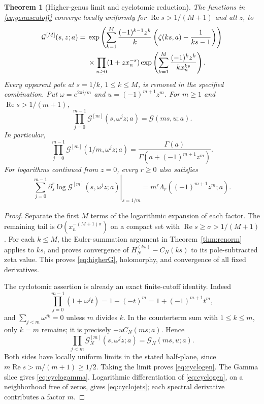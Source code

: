 \documentclass[11pt]{article}
\numberwithin{equation}{section}
\newtheorem{theorem}{Theorem}[section]
\theoremstyle{definition}\newtheorem{definition}[theorem]{Definition}
\theoremstyle{remark}\newtheorem{remark}[theorem]{Remark}
\DeclareMathOperator{\Rea}{Re}
\newcommand{\G}{\mathcal G}\newcommand{\F}{\mathfrak F}
\begin{document}
\begin{theorem}[Higher-genus limit and cyclotomic reduction]
\label{thm:cyclotomic}
The functions in \eqref{eq:genuscutoff} converge locally uniformly for
$\Rea s>1/(M+1)$ and all $z$, to
\begin{align}
 \G^{[M]}(s,z;a)
 ={}&\exp\left(\sum_{k=1}^M\frac{(-1)^{k-1}z^k}{k}
            \left(\zeta(ks,a)-\frac1{ks-1}\right)\right)\notag\\
 &\times\prod_{n\ge0}(1+zx_n^{-s})
       \exp\left(\sum_{k=1}^M\frac{(-1)^kz^k}{kx_n^{ks}}\right).
 \label{eq:higherG}
\end{align}
Every apparent pole at $s=1/k$, $1\le k\le M$, is removed in the
specified combination. Put $\omega=e^{2\pi i/m}$ and
$u=(-1)^{m+1}z^m$. For $m\ge1$ and $\Rea s>1/(m+1)$,
\begin{equation}
 \prod_{j=0}^{m-1}\G^{[m]}(s,\omega^jz;a)=\G(ms,u;a).
 \label{eq:cyclogen}
\end{equation}
In particular,
\begin{equation}
 \boxed{\prod_{j=0}^{m-1}\G^{[m]}(1/m,\omega^jz;a)
       =\frac{\Gamma(a)}{\Gamma(a+(-1)^{m+1}z^m)}}.
 \label{eq:cyclogamma}
\end{equation}
For logarithms continued from $z=0$, every $r\ge0$ also satisfies
\begin{equation}
 \left.\sum_{j=0}^{m-1}\partial_s^r
       \log\G^{[m]}(s,\omega^jz;a)\right|_{s=1/m}
       =m^r\Lambda_r((-1)^{m+1}z^m;a).
 \label{eq:cyclojets}
\end{equation}
\end{theorem}
\begin{proof}
Separate the first $M$ terms of the logarithmic expansion of each factor.
The remaining tail is $O(x_n^{-(M+1)\sigma})$ on a compact set with
$\Rea s\ge\sigma>1/(M+1)$. For each $k\le M$, the Euler-summation
argument in Theorem~\ref{thm:renorm} applies to $ks$, and proves convergence
of $H_N^{(ks)}-C_N(ks)$ to its pole-subtracted zeta value. This proves
\eqref{eq:higherG}, holomorphy, and convergence of all fixed derivatives.

The cyclotomic assertion is already an exact finite-cutoff identity.
Indeed
\[
 \prod_{j=0}^{m-1}(1+\omega^jt)=1-(-t)^m
             =1+(-1)^{m+1}t^m,
\]
and $\sum_{j<m}\omega^{jk}=0$ unless $m$ divides $k$. In the counterterm
sum with $1\le k\le m$, only $k=m$ remains; it is precisely
$-uC_N(ms;a)$. Hence
\[
 \prod_{j<m}\G_N^{[m]}(s,\omega^jz;a)=\G_N(ms,u;a).
\]
Both sides have locally uniform limits in the stated half-plane, since
$m\Rea s>m/(m+1)\ge1/2$. Taking the limit proves \eqref{eq:cyclogen}.
The Gamma slice gives \eqref{eq:cyclogamma}. Logarithmic differentiation of
\eqref{eq:cyclogen}, on a neighborhood free of zeros, gives
\eqref{eq:cyclojets}; each spectral derivative contributes a factor $m$.
\end{proof}
\end{document}
